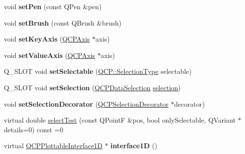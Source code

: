 \begin{DoxyCompactItemize}
\item 
void {\bfseries set\+Pen} (const Q\+Pen \&pen)\hypertarget{class_q_c_p_abstract_plottable_ab74b09ae4c0e7e13142fe4b5bf46cac7}{}\label{class_q_c_p_abstract_plottable_ab74b09ae4c0e7e13142fe4b5bf46cac7}

\item 
void {\bfseries set\+Brush} (const Q\+Brush \&brush)\hypertarget{class_q_c_p_abstract_plottable_a7a4b92144dca6453a1f0f210e27edc74}{}\label{class_q_c_p_abstract_plottable_a7a4b92144dca6453a1f0f210e27edc74}

\item 
void {\bfseries set\+Key\+Axis} (\hyperlink{class_q_c_p_axis}{Q\+C\+P\+Axis} $\ast$axis)\hypertarget{class_q_c_p_abstract_plottable_a8524fa2994c63c0913ebd9bb2ffa3920}{}\label{class_q_c_p_abstract_plottable_a8524fa2994c63c0913ebd9bb2ffa3920}

\item 
void {\bfseries set\+Value\+Axis} (\hyperlink{class_q_c_p_axis}{Q\+C\+P\+Axis} $\ast$axis)\hypertarget{class_q_c_p_abstract_plottable_a71626a07367e241ec62ad2c34baf21cb}{}\label{class_q_c_p_abstract_plottable_a71626a07367e241ec62ad2c34baf21cb}

\item 
Q\+\_\+\+S\+L\+OT void {\bfseries set\+Selectable} (\hyperlink{namespace_q_c_p_ac6cb9db26a564b27feda362a438db038}{Q\+C\+P\+::\+Selection\+Type} selectable)\hypertarget{class_q_c_p_abstract_plottable_a068d169679b7088d28aa3ba5e663dd8c}{}\label{class_q_c_p_abstract_plottable_a068d169679b7088d28aa3ba5e663dd8c}

\item 
Q\+\_\+\+S\+L\+OT void {\bfseries set\+Selection} (\hyperlink{class_q_c_p_data_selection}{Q\+C\+P\+Data\+Selection} \hyperlink{class_q_c_p_abstract_plottable_a6fcea502826afbaab2568bd3ebc61b4b}{selection})\hypertarget{class_q_c_p_abstract_plottable_a8b94acee63e2c9c0284164f25d44fd0d}{}\label{class_q_c_p_abstract_plottable_a8b94acee63e2c9c0284164f25d44fd0d}

\item 
void {\bfseries set\+Selection\+Decorator} (\hyperlink{class_q_c_p_selection_decorator}{Q\+C\+P\+Selection\+Decorator} $\ast$decorator)\hypertarget{class_q_c_p_abstract_plottable_a20e266ad646f8c4a7e4631040510e5d9}{}\label{class_q_c_p_abstract_plottable_a20e266ad646f8c4a7e4631040510e5d9}

\item 
virtual double \hyperlink{class_q_c_p_abstract_plottable_a38efe9641d972992a3d44204bc80ec1d}{select\+Test} (const Q\+PointF \&pos, bool only\+Selectable, Q\+Variant $\ast$details=0) const =0
\item 
virtual \hyperlink{class_q_c_p_plottable_interface1_d}{Q\+C\+P\+Plottable\+Interface1D} $\ast$ {\bfseries interface1D} ()\hypertarget{class_q_c_p_abstract_plottable_af283378dacd1b247bf557f46a9144686}{}\label{class_q_c_p_abstract_plottable_af283378dacd1b247bf557f46a9144686}


\end{DoxyCompactItemize}
